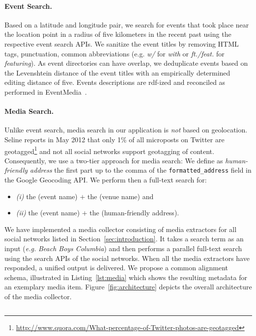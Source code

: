 \documentclass[runningheads,a4paper]{llncs}
\begin{document}
{\paragraph{Event Search.} Based on a latitude and longitude pair, we search for events that took place near the location point in a radius of five kilometers in the recent past using the respective event search APIs. We sanitize the event titles by removing HTML tags, punctuation, common abbreviations (e.g. \emph{w/} for \emph{with} or \emph{ft./feat.} for \emph{featuring}). As event directories can have overlap, we deduplicate events based on the Levenshtein distance of the event titles with an empirically determined editing distance of five. Events descriptions are rdf-ized and reconciled as performed in EventMedia~\cite{Khrouf2012}.

\paragraph{Media Search.} Unlike event search, media search in our application is \emph{not} based on geolocation. Seline reports in May 2012 that only 1\% of all microposts on Twitter are geotagged\footnote{\url{http://www.quora.com/What-percentage-of-Twitter-photos-are-geotagged}} and not all social networks support geotagging of content. Consequently, we use a two-tier approach for media search: We define as \emph{human-friendly address} the first part up to the comma of the \texttt{formatted\_address} field in the Google Geocoding API. We perform then a full-text search for:
\begin{itemize}
 \item \emph{(i)} the (event name) $+$ the (venue name) and
 \item \emph{(ii)} the (event name) $+$ the (human-friendly address).
\end{itemize}
We have implemented a media collector consisting of media extractors for all social networks listed in Section~\ref{sec:introduction}. It takes a search term as an input (\emph{e.g.} \emph{Beach Boys Columbia}) and then performs a parallel full-text search using the search APIs of the social networks. When all the media extractors have responded, a unified output is delivered. We propose a common alignment schema, illustrated in Listing~\ref{lst:media} which shows the resulting metadata for an exemplary media item. Figure~\ref{fig:architecture} depicts the overall architecture of the media collector.
\begin{lstlisting}[language=JavaScript,caption={Sample output of the media collector showing a Google+ post},label={lst:media}]

\end{lstlisting}}
\end{document}
